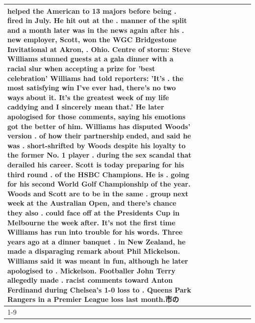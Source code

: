 \begin{table}[H]
\begin{tabular}{lllrlllll}
helped the American to 13 majors before being . fired in July. He hit out at the . manner of the split and a month later was in the news again after his . new employer, Scott, won the WGC Bridgestone Invitational at Akron, . Ohio. Centre of storm: Steve Williams stunned guests at a gala dinner with a racial slur when accepting a prize for 'best celebration' Williams had told reporters: 'It's . the most satisfying win I've ever had, there's no two ways about it. It's the greatest week of my life caddying and I sincerely mean that.' He later apologised for those comments, saying his emotions got the better of him. Williams has disputed Woods' version . of how their partnership ended, and said he was . short-shrifted by Woods despite his loyalty to the former No. 1 player . during the sex scandal that derailed his career. Scott is today preparing for his third round . of the HSBC Champions. He is . going for his second World Golf Championship of the year. Woods and Scott are to be in the same . group next week at the Australian Open, and there's chance they also . could face off at the Presidents Cup in Melbourne the week after. It's not the first time Williams has run into trouble for his words. Three years ago at a dinner banquet . in New Zealand, he made a disparaging remark about Phil Mickelson. Williams said it was meant in fun, although he later apologised to . Mickelson. Footballer John Terry allegedly made . racist comments toward Anton Ferdinand during Chelsea's 1-0 loss to . Queens Park Rangers in a Premier League loss last month.市の \\
\cline{1-9}

\end{tabular}
\end{table}
